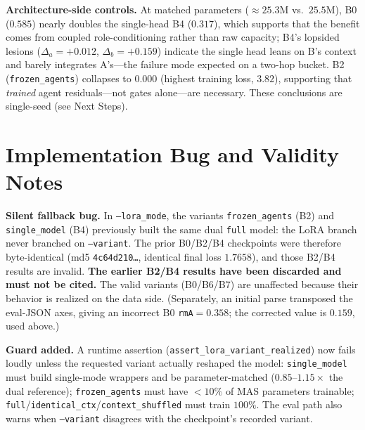 \documentclass[10pt]{article}
\begin{document}
\noindent\textbf{Architecture-side controls.} At matched parameters (${\approx}25.3$M vs.\
$25.5$M), B0 ($0.585$) nearly doubles the single-head B4 ($0.317$), which supports that the
benefit comes from coupled role-conditioning rather than raw capacity; B4's lopsided lesions
($\Delta_a{=}{+}0.012$, $\Delta_b{=}{+}0.159$) indicate the single head leans on B's context and
barely integrates A's---the failure mode expected on a two-hop bucket. B2 (\texttt{frozen\_agents})
collapses to $0.000$ (highest training loss, $3.82$), supporting that \emph{trained} agent
residuals---not gates alone---are necessary. These conclusions are single-seed (see Next Steps).

\section{Implementation Bug and Validity Notes}\label{sec:bug}
\textbf{Silent fallback bug.} In \texttt{--lora\_mode}, the variants \texttt{frozen\_agents}
(B2) and \texttt{single\_model} (B4) previously built the same dual \texttt{full} model: the
LoRA branch never branched on \texttt{--variant}. The prior B0/B2/B4 checkpoints were
therefore byte-identical (md5 \texttt{4c64d210\ldots}, identical final loss $1.7658$), and
those B2/B4 results are invalid. \textbf{The earlier B2/B4 results have been discarded and
must not be cited.} The valid variants (B0/B6/B7) are unaffected because their behavior is
realized on the data side. (Separately, an initial parse transposed the eval-JSON axes,
giving an incorrect B0 \texttt{rmA}$=0.358$; the corrected value is $0.159$, used above.)

\noindent\textbf{Guard added.} A runtime assertion (\texttt{assert\_lora\_variant\_realized})
now fails loudly unless the requested variant actually reshaped the model:
\texttt{single\_model} must build single-mode wrappers and be parameter-matched
($0.85$--$1.15\times$ the dual reference); \texttt{frozen\_agents} must have $<10\%$ of MAS
parameters trainable; \texttt{full}/\texttt{identical\_ctx}/\texttt{context\_shuffled} must
train $100\%$. The eval path also warns when \texttt{--variant} disagrees with the
checkpoint's recorded variant.
\end{document}
